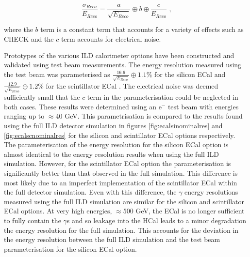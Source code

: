 \begin{equation} 
\frac{\sigma_{Reco}}{E_{Reco}} = \frac{a}{\sqrt{E_{Reco}}} \oplus b \oplus \frac{c}{E_{Reco}}\text{ ,}
\end{equation}

\noindent where the $b$ term is a constant term that accounts for a variety of effects such as CHECK and the $c$ term accounts for electrical noise.

Prototypes of the various ILD calorimeter options have been constructed and validated using test beam measurements.  The energy resolution measured using the test beam was parameterised as $\frac{16.6}{\sqrt{E_{Reco}}} \oplus 1.1 \%$ for the silicon ECal and $\frac{12.9}{\sqrt{E_{Reco}}} \oplus 1.2 \%$ for the scintillator ECal \cite{Behnke:2013lya}.  The electrical noise was deemed sufficiently small that the $c$ term in the parameterisation could be neglected in both cases.  These results were determined using an $\text{e}^{-}$ test beam with energies ranging up to $\approx 40$ GeV.  This parametrisation is compared to the results found using the full ILD detector simulation in figures \ref{fig:ecalsinominalres} and \ref{fig:ecalscnominalres} for the silicon and scintillator ECal options respectively.  The parameterisation of the energy resolution for the silicon ECal option is almost identical to the energy resolution results when using the full ILD simulation.  However, for the scintillator ECal option the parameterisation is significantly better than that observed in the full simulation.  This difference is most likely due to an imperfect implementation of the scintillator ECal within the full detector simulation.  Even with this difference, the $\gamma$ energy resolutions measured using the full ILD simulation are similar for the silicon and scintillator ECal options.  At very high energies, $\approx 500$ GeV, the ECal is no longer sufficient to fully contain the $\gamma$s and so leakage into the HCal leads to a minor degradation the energy resolution for the full simulation.  This accounts for the deviation in the energy resolution between the full ILD simulation and the test beam parameterisation for the silicon ECal option.   

